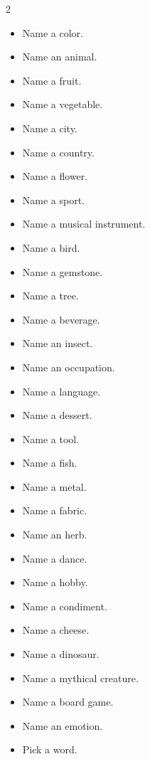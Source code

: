 \documentclass[11pt]{article}
\begin{document}
\begin{multicols}{2}
\small
\begin{itemize}\setlength{\itemsep}{1pt}
\item Name a color.
\item Name an animal.
\item Name a fruit.
\item Name a vegetable.
\item Name a city.
\item Name a country.
\item Name a flower.
\item Name a sport.
\item Name a musical instrument.
\item Name a bird.
\item Name a gemstone.
\item Name a tree.
\item Name a beverage.
\item Name an insect.
\item Name an occupation.
\item Name a language.
\item Name a dessert.
\item Name a tool.
\item Name a fish.
\item Name a metal.
\item Name a fabric.
\item Name an herb.
\item Name a dance.
\item Name a hobby.
\item Name a condiment.
\item Name a cheese.
\item Name a dinosaur.
\item Name a mythical creature.
\item Name a board game.
\item Name an emotion.
\item Pick a word.
\end{itemize}
\end{multicols}
\end{document}
